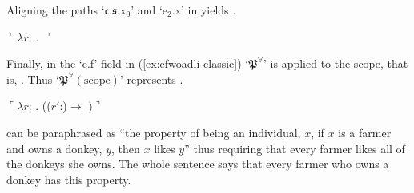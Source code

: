 Aligning the paths `$\mathfrak{c}.\mathfrak{s}.\text{x}_0$' and
`e$_2$.x' in \preveg{} yields \nexteg{}.
\begin{ex} 
$\ulcorner\lambda r$:
   .
  $\urcorner$ 
\end{ex} 
Finally, in the `e.f'-field in (\ref{ex:efwoadli-classic})
`$\mathfrak{P}^\forall$' is applied to the scope, that is, \preveg{}.
Thus `$\mathfrak{P}^\forall(\text{scope})$' represents \nexteg{}.
\begin{ex} 
 $\ulcorner\lambda r$: . (($r'$:)$\rightarrow$
  $)\urcorner$
\end{ex} 
\preveg{} can be paraphrased as ``the property of being an individual,
$x$, if $x$ is a farmer and owns a donkey, $y$, then $x$ likes $y$''
thus requiring that every farmer likes all of the donkeys she owns.
The whole sentence says that every farmer who owns a donkey has this property.  


